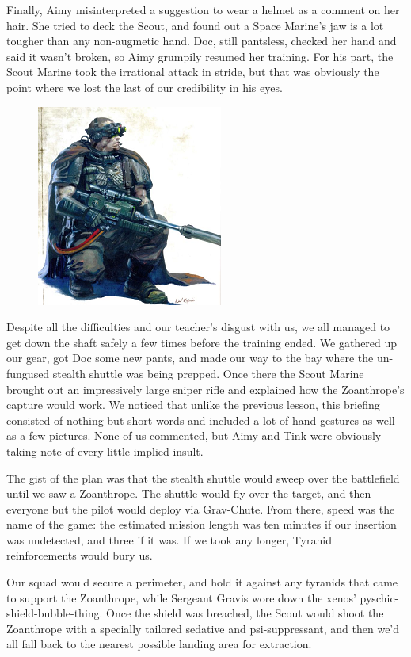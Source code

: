 Finally, Aimy misinterpreted a suggestion to wear a helmet as a comment on her hair. 
She tried to deck the Scout, and found out a Space Marine's jaw is a lot tougher than any non-augmetic hand. 
Doc, still pantsless, checked her hand and said it wasn't broken, so Aimy grumpily resumed her training. 
For his part, the Scout Marine took the irrational attack in stride, but that was obviously the point where we lost the last of our credibility in his eyes.
\begin{figure}
	\begin{center}
		\includegraphics[width=\figwidth]{pics/12/26.png}
	\end{center}
\end{figure}
Despite all the difficulties and our teacher's disgust with us, we all managed to get down the shaft safely a few times before the training ended. 
We gathered up our gear, got Doc some new pants, and made our way to the bay where the un-fungused stealth shuttle was being prepped. 
Once there the Scout Marine brought out an impressively large sniper rifle and explained how the Zoanthrope's capture would work. 
We noticed that unlike the previous lesson, this briefing consisted of nothing but short words and included a lot of hand gestures as well as a few pictures. 
None of us commented, but Aimy and Tink were obviously taking note of every little implied insult.

The gist of the plan was that the stealth shuttle would sweep over the battlefield until we saw a Zoanthrope. 
The shuttle would fly over the target, and then everyone but the pilot would deploy via Grav-Chute. 
From there, speed was the name of the game: 
the estimated mission length was ten minutes if our insertion was undetected, and three if it was. 
If we took any longer, Tyranid reinforcements would bury us.

Our squad would secure a perimeter, and hold it against any tyranids that came to support the Zoanthrope, while Sergeant Gravis wore down the xenos' pyschic-shield-bubble-thing. 
Once the shield was breached, the Scout would shoot the Zoanthrope with a specially tailored sedative and psi-suppressant, and then we'd all fall back to the nearest possible landing area for extraction. 


